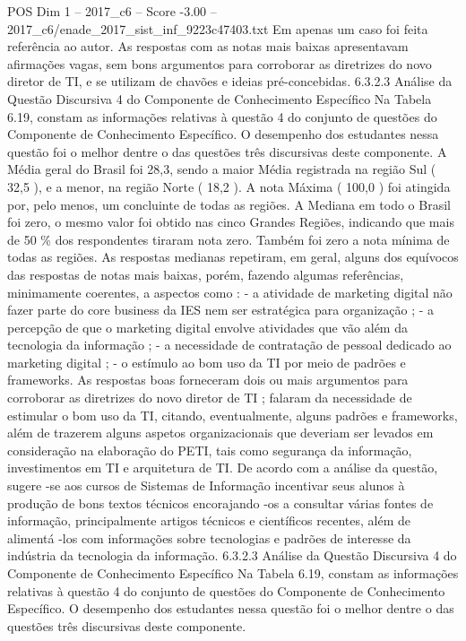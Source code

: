 \begin{textsample}{POS Dim 1 – 2017\_c6 – Score -3.00 – 2017\_c6/enade\_2017\_sist\_inf\_9223c47403.txt}
Em apenas um caso foi feita referência ao autor.
As respostas com as notas mais baixas apresentavam afirmações vagas, sem bons argumentos para corroborar as diretrizes do novo diretor de TI, e se utilizam de chavões e ideias pré-concebidas. 6.3.2.3 Análise da Questão Discursiva 4 do Componente de Conhecimento Específico Na Tabela 6.19, constam as informações relativas à questão 4 do conjunto de questões do Componente de Conhecimento Específico.
O desempenho dos estudantes nessa questão foi o melhor dentre o das questões três discursivas deste componente.
A Média geral do Brasil foi 28,3, sendo a maior Média registrada na região Sul ( 32,5 ), e a menor, na região Norte ( 18,2 ).
A nota Máxima ( 100,0 ) foi atingida por, pelo menos, um concluinte de todas as regiões.
A Mediana em todo o Brasil foi zero, o mesmo valor foi obtido nas cinco Grandes Regiões, indicando que mais de 50 \% dos respondentes tiraram nota zero.
Também foi zero a nota mínima de todas as regiões.
As respostas medianas repetiram, em geral, alguns dos equívocos das respostas de notas mais baixas, porém, fazendo algumas referências, minimamente coerentes, a aspectos como : - a atividade de marketing digital não fazer parte do core business da IES nem ser estratégica para organização ; - a percepção de que o marketing digital envolve atividades que vão além da tecnologia da informação ; - a necessidade de contratação de pessoal dedicado ao marketing digital ; - o estímulo ao bom uso da TI por meio de padrões e frameworks.
As respostas boas forneceram dois ou mais argumentos para corroborar as diretrizes do novo diretor de TI ; falaram da necessidade de estimular o bom uso da TI, citando, eventualmente, alguns padrões e frameworks, além de trazerem alguns aspetos organizacionais que deveriam ser levados em consideração na elaboração do PETI, tais como segurança da informação, investimentos em TI e arquitetura de TI.
De acordo com a análise da questão, sugere -se aos cursos de Sistemas de Informação incentivar seus alunos à produção de bons textos técnicos encorajando -os a consultar várias fontes de informação, principalmente artigos técnicos e científicos recentes, além de alimentá -los com informações sobre tecnologias e padrões de interesse da indústria da tecnologia da informação. 6.3.2.3 Análise da Questão Discursiva 4 do Componente de Conhecimento Específico Na Tabela 6.19, constam as informações relativas à questão 4 do conjunto de questões do Componente de Conhecimento Específico.
O desempenho dos estudantes nessa questão foi o melhor dentre o das questões três discursivas deste componente.

\end{textsample}
